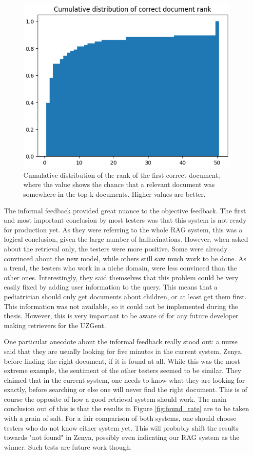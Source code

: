 \begin{figure}[H]
    \captionsetup{justification=centering}
    \centerline{\includegraphics[width=0.7\linewidth]{fig/rag_cumulative_doc_rank.png}}
    \caption{Cumulative distribution of the rank of the first correct document, where the value shows the chance that a relevant document was somewhere in the top-k documents. Higher values are better.}
    \label{fig:chunk_rank_cumulative_distribution}
\end{figure}

The informal feedback provided great nuance to the objective feedback. The first and most important conclusion by most testers was that this system is not ready for production yet. As they were referring to the whole RAG system, this was a logical conclusion, given the large number of hallucinations. However, when asked about the retrieval only, the testers were more positive. Some were already convinced about the new model, while others still saw much work to be done. As a trend, the testers who work in a niche domain, were less convinced than the other ones. Interestingly, they said themselves that this problem could be very easily fixed by adding user information to the query. This means that a pediatrician should only get documents about children, or at least get them first. This information was not available, so it could not be implemented during the thesis. However, this is very important to be aware of for any future developer making retrievers for the UZGent.

One particular anecdote about the informal feedback really stood out: a nurse said that they are usually looking for five minutes in the current system, Zenya, before finding the right document, if it is found at all. While this was the most extreme example, the sentiment of the other testers seemed to be similar. They claimed that in the current system, one needs to know what they are looking for exactly, before searching or else one will never find the right document. This is of course the opposite of how a good retrieval system should work. The main conclusion out of this is that the results in Figure \ref{fig:found_rate} are to be taken with a grain of salt. For a fair comparison of both systems, one should choose testers who do not know either system yet. This will probably shift the results towards "not found" in Zenya, possibly even indicating our RAG system as the winner. Such tests are future work though.

